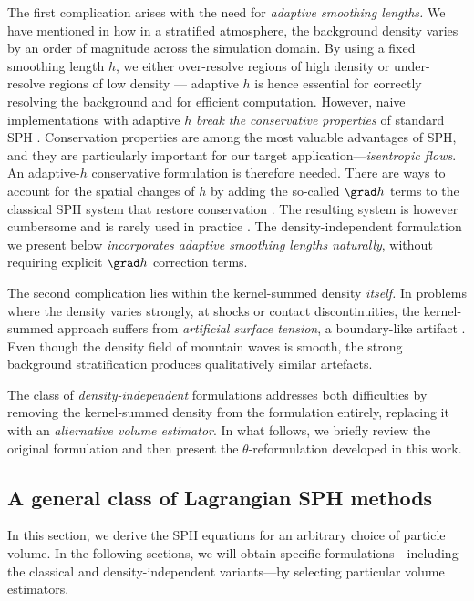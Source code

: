 \documentclass[../main.tex]{subfiles}
\begin{document}
The first complication arises with the need for \emph{adaptive smoothing lengths.} We have mentioned in  how in a stratified atmosphere, the background density varies by an order of magnitude across the simulation domain. By using a fixed smoothing length $h$, we either over-resolve regions of high density or under-resolve regions of low density --- adaptive $h$ is hence essential for correctly resolving the background and for efficient computation.
However, naive implementations with adaptive $h$ \emph{break the conservative properties} of standard SPH \autocite{hernquistCautionaryRemarksSmoothed1993,nelsonVariableSmoothingLengths1994}. Conservation properties are among the most valuable advantages of SPH, and they are particularly important for our target application---\emph{isentropic flows}. An adaptive-$h$ conservative formulation is therefore needed. There are ways to account for the spatial changes of $h$ by adding the so-called $\grad h$ terms to the classical SPH system that restore conservation \autocite{nelsonThreedimensionalHydrodynamicSimulations1993,nelsonVariableSmoothingLengths1994}. The resulting system is however cumbersome and is rarely used in practice \autocite[p.~4]{springelCosmologicalSPHSimulations2002}. The density-independent formulation we present below \emph{incorporates adaptive smoothing lengths naturally}, without requiring explicit $\grad h$ correction terms.

The second complication lies within the kernel-summed density \emph{itself.} In problems where the density varies strongly, \eg at shocks or contact discontinuities, the kernel-summed approach suffers from \emph{artificial surface tension}, a boundary-like artifact \autocite{hopkinsGeneralClassLagrangian2013a}. Even though the density field of mountain waves is smooth, the strong background stratification produces qualitatively similar artefacts.

The class of \emph{density-independent} formulations \autocite{saitohDensityIndependentFormulation2013,hopkinsGeneralClassLagrangian2013a} addresses both difficulties by removing the kernel-summed density from the formulation entirely, replacing it with an \emph{alternative volume estimator}. In what follows, we briefly review the original formulation and then present the $\theta$-reformulation developed in this work. 

\subsection{A general class of Lagrangian SPH methods}
\label{sec:GENERAL-CLASS}
In this section, we derive the SPH equations for an arbitrary choice of particle volume. In the following sections, we will obtain specific formulations---including the classical and density-independent variants---by selecting particular volume estimators.
\end{document}
